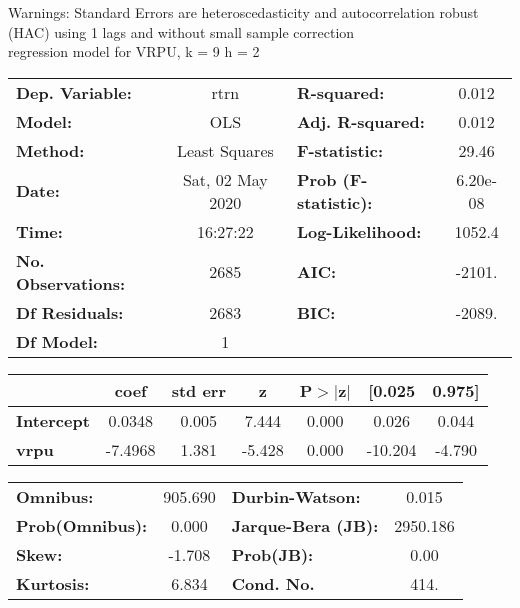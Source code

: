 Warnings: \newline
 [1] Standard Errors are heteroscedasticity and autocorrelation robust (HAC) using 1 lags and without small sample correction\\ 

regression model for VRPU, k = 9 h = 2\begin{center}
\begin{tabular}{lclc}
\toprule
\textbf{Dep. Variable:}    &       rtrn       & \textbf{  R-squared:         } &     0.012   \\
\textbf{Model:}            &       OLS        & \textbf{  Adj. R-squared:    } &     0.012   \\
\textbf{Method:}           &  Least Squares   & \textbf{  F-statistic:       } &     29.46   \\
\textbf{Date:}             & Sat, 02 May 2020 & \textbf{  Prob (F-statistic):} &  6.20e-08   \\
\textbf{Time:}             &     16:27:22     & \textbf{  Log-Likelihood:    } &    1052.4   \\
\textbf{No. Observations:} &        2685      & \textbf{  AIC:               } &    -2101.   \\
\textbf{Df Residuals:}     &        2683      & \textbf{  BIC:               } &    -2089.   \\
\textbf{Df Model:}         &           1      & \textbf{                     } &             \\
\bottomrule
\end{tabular}
\begin{tabular}{lcccccc}
                   & \textbf{coef} & \textbf{std err} & \textbf{z} & \textbf{P$> |$z$|$} & \textbf{[0.025} & \textbf{0.975]}  \\
\midrule
\textbf{Intercept} &       0.0348  &        0.005     &     7.444  &         0.000        &        0.026    &        0.044     \\
\textbf{vrpu}      &      -7.4968  &        1.381     &    -5.428  &         0.000        &      -10.204    &       -4.790     \\
\bottomrule
\end{tabular}
\begin{tabular}{lclc}
\textbf{Omnibus:}       & 905.690 & \textbf{  Durbin-Watson:     } &    0.015  \\
\textbf{Prob(Omnibus):} &   0.000 & \textbf{  Jarque-Bera (JB):  } & 2950.186  \\
\textbf{Skew:}          &  -1.708 & \textbf{  Prob(JB):          } &     0.00  \\
\textbf{Kurtosis:}      &   6.834 & \textbf{  Cond. No.          } &     414.  \\
\bottomrule
\end{tabular}
\end{center}

